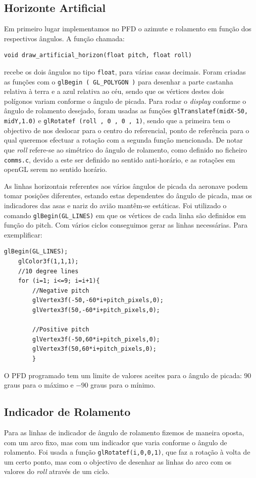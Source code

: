 \documentclass[palatino]{ist-report}
\begin{document}
\subsection{Horizonte Artificial}
Em primeiro lugar implementamos no PFD o azimute e rolamento em função dos respectivos ângulos. A função chamada:   
\begin{verbatim}
void draw_artificial_horizon(float pitch, float roll)
\end{verbatim}
recebe os dois ângulos no tipo \texttt{float}, para várias casas decimais. Foram criadas as funções com o \texttt{glBegin ( GL\_POLYGON )} para desenhar a parte castanha relativa à terra e a azul relativa ao céu, sendo que os vértices destes dois polígonos variam conforme o ângulo de picada. Para rodar o \textit{display} conforme o ângulo de rolamento desejado, foram usadas as funções \texttt{glTranslatef(midX-50, midY,1.0)} e \texttt{glRotatef (roll , 0 , 0 , 1)}, sendo que a primeira tem o objectivo de nos deslocar para o centro do referencial, ponto de referência para o qual queremos efectuar a rotação com a segunda função mencionada. De notar que \textit{roll} refere-se ao simétrico do ângulo de rolamento, como definido no ficheiro \texttt{comms.c}, devido a este ser definido no sentido anti-horário, e as rotações em openGL serem no sentido horário.

As linhas horizontais referentes aos vários ângulos de picada da aeronave podem tomar posições diferentes, estando estas dependentes do ângulo de picada, mas os indicadores das asas e nariz do avião mantêm-se estáticas. Foi utilizado o comando \texttt{glBegin(GL\_LINES)} em que os vértices de cada linha são definidos em função do pitch. Com vários ciclos conseguimos gerar as linhas necessárias. Para exemplificar:
\begin{verbatim}
glBegin(GL_LINES);
    glColor3f(1,1,1);
    //10 degree lines
    for (i=1; i<=9; i=i+1){
        //Negative pitch
        glVertex3f(-50,-60*i+pitch_pixels,0);
        glVertex3f(50,-60*i+pitch_pixels,0);

        //Positive pitch
        glVertex3f(-50,60*i+pitch_pixels,0);
        glVertex3f(50,60*i+pitch_pixels,0);
        }

\end{verbatim}

O PFD programado tem um limite de valores aceites para o ângulo de picada: $90$ graus para o máximo e $-90$ graus para o mínimo. 

\subsection{Indicador de Rolamento}
Para as linhas de indicador de ângulo de rolamento fizemos de maneira oposta, com um arco fixo, mas com um indicador que varia conforme o ângulo de rolamento. Foi usada a função \texttt{glRotatef(i,0,0,1)}, que faz a rotação à volta de um certo ponto, mas com o objectivo de desenhar as linhas do arco com os valores do \textit{roll} através de um ciclo. 
\end{document}

